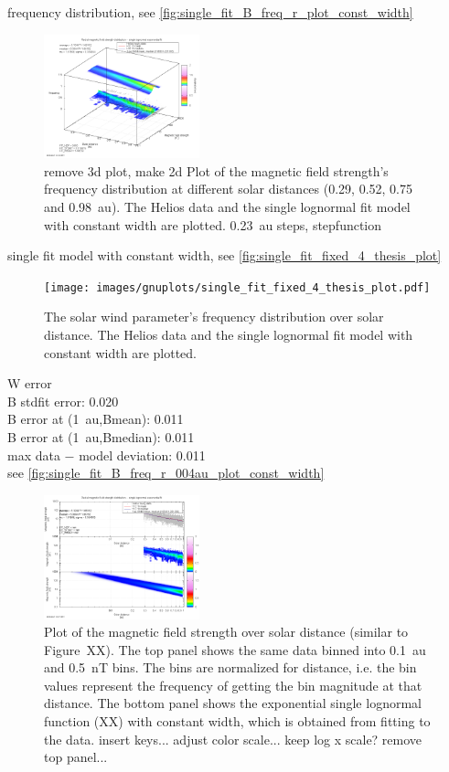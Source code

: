frequency distribution, see \autoref{fig:single_fit_B_freq_r_plot_const_width}
\begin{figure}[htb]
	\centering
	\includegraphics[width=0.4\textwidth]{images/gnuplots/single_fit_B_freq_r_plot_const_width.png}
	\caption{remove 3d plot, make 2d Plot of the magnetic field strength's frequency distribution at different solar distances (0.29, 0.52, 0.75 and 0.98~au). The Helios data and the single lognormal fit model with constant width are plotted. 0.23~au steps, stepfunction}
	\label{fig:single_fit_B_freq_r_plot_const_width}
\end{figure}

single fit model with constant width, see \autoref{fig:single_fit_fixed_4_thesis_plot}
\begin{figure}[htb]
	\centering
	\texttt{[image: images/gnuplots/single\_fit\_fixed\_4\_thesis\_plot.pdf]}
	\caption{The solar wind parameter's frequency distribution over solar distance. The Helios data and the single lognormal fit model with constant width are plotted.}
	\label{fig:single_fit_fixed_4_thesis_plot}
\end{figure}

W error\\
B stdfit error: 0.020\\
B error at (1~au,Bmean): 0.011\\
B error at (1~au,Bmedian): 0.011\\
max data $-$ model deviation: 0.011\\

see \autoref{fig:single_fit_B_freq_r_004au_plot_const_width}
\begin{figure}[htb]
	\centering
	\includegraphics[width=0.4\textwidth]{images/gnuplots/single_fit_B_freq_r_004au_plot_const_width.png}
	\caption{Plot of the magnetic field strength over solar distance (similar to Figure~XX). The top panel shows the same data binned into 0.1~au and 0.5~nT bins. The bins are normalized for distance, i.e. the bin values represent the frequency of getting the bin magnitude at that distance. The bottom panel shows the exponential single lognormal function (XX) with constant width, which is obtained from fitting to the data. insert keys... adjust color scale... keep log x scale? remove top panel...}
	\label{fig:single_fit_B_freq_r_004au_plot_const_width}
\end{figure}

